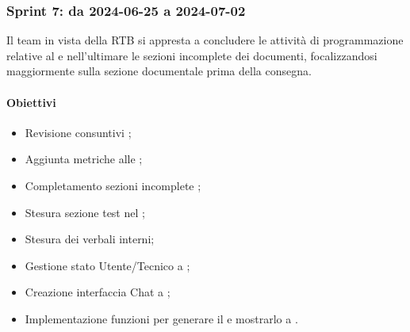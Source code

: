 \subsubsection{Sprint 7: da 2024-06-25 a 2024-07-02}
Il team in vista della RTB si appresta a concludere le attività di programmazione relative al  e nell'ultimare le sezioni incomplete dei documenti, focalizzandosi maggiormente sulla sezione documentale  prima della consegna.


\paragraph{Obiettivi}
\begin{itemize}
  \item Revisione consuntivi \PdP;
  \item Aggiunta metriche alle \NdP;
  \item Completamento sezioni incomplete \NdP;
  \item Stesura sezione test nel \PdQ;
  \item Stesura dei verbali interni;
  \item Gestione stato Utente/Tecnico a ;
  \item Creazione interfaccia Chat a ;
  \item Implementazione funzioni per generare il  e mostrarlo a .
\end{itemize}

\vspace{0.5\baselineskip}
\par [Inserire Gantt]
